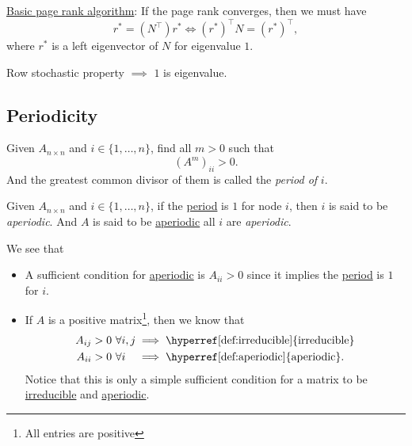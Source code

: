 \begin{prev}
	\hyperref[algo:basic-page-rank-algorithm]{Basic page rank algorithm}: If the page rank converges,
	then we must have
	\[
		r^{\ast} = (N^{\top})r^{\ast} \iff (r^{\ast})^{\top} N = (r^{\ast})^{\top},
	\]
	where \(r^{\ast}\) is a left eigenvector of \(N\) for eigenvalue \(1\).
\end{prev}
\begin{remark}
	Row stochastic property \(\implies\) \(1\) is eigenvalue.
\end{remark}

\subsection{Periodicity}
\begin{definition}[Period]\label{def:period}
	Given \(A_{n\times n}\) and \(i\in\{1, \ldots , n\}\), find all \(m>0\) such that
	\[
		(A^m)_{ii}>0.
	\]
	And the greatest common divisor of them is called the \emph{period of} \(i\).
\end{definition}

\begin{definition}[Aperiodic]\label{def:aperiodic}
	Given \(A_{n\times n}\) and \(i\in\{1, \ldots , n\}\), if the \hyperref[def:period]{period} is \(1\) for node \(i\), then \(i\)
	is said to be \emph{aperiodic}. And \(A\) is said to be \hyperref[def:aperiodic]{aperiodic} all \(i\) are \emph{aperiodic}.
\end{definition}

\begin{remark}
	We see that
	\begin{itemize}
		\item A sufficient condition for \hyperref[def:aperiodic]{aperiodic} is \(A_{ii} > 0 \) since it implies the \hyperref[def:period]{period} is \(1\) for \(i\).
		\item If \(A\) is a positive matrix\footnote{All entries are positive}, then we know that
		      \[
			      \begin{alignedat}{3}
				      A_{ij}>0\ &\forall i, j &&\implies \text{\hyperref[def:irreducible]{irreducible}}\\
				      A_{ii}>0\ &\forall i &&\implies \text{\hyperref[def:aperiodic]{aperiodic}}.
			      \end{alignedat}
		      \]
		      Notice that this is only a simple sufficient condition for a matrix to be \hyperref[def:irreducible]{irreducible} and \hyperref[def:aperiodic]{aperiodic}.
	\end{itemize}
\end{remark}

